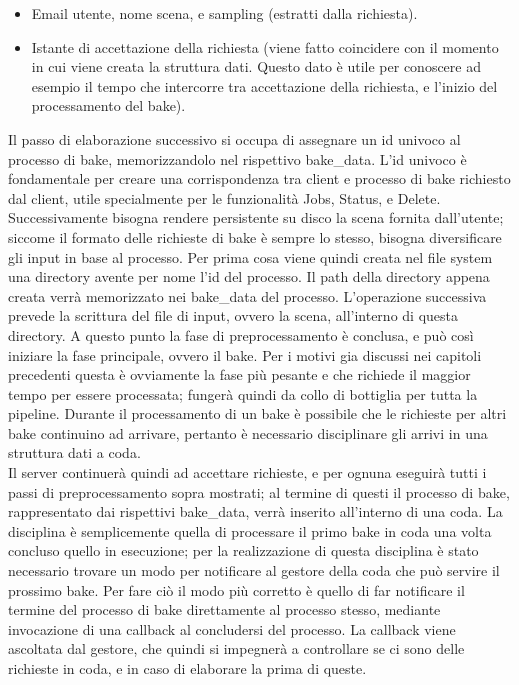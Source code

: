\begin{itemize}
\item Email utente, nome scena, e sampling (estratti dalla richiesta).
\item Istante di accettazione della richiesta (viene fatto coincidere con il momento in cui viene creata la struttura dati. Questo dato è utile per conoscere ad esempio il tempo che intercorre tra accettazione della richiesta, e l’inizio del processamento del bake).
\end{itemize}
Il passo di elaborazione successivo si occupa di assegnare un id univoco al processo di bake, memorizzandolo nel rispettivo bake\_data. L’id univoco è fondamentale per creare una corrispondenza tra client e processo di bake richiesto dal client, utile specialmente per le funzionalità Jobs, Status, e Delete. 
Successivamente bisogna rendere persistente su disco la scena fornita dall’utente; siccome il formato delle richieste di bake è sempre lo stesso, bisogna diversificare gli input in base al processo. Per prima cosa viene quindi creata nel file system una directory avente per nome l’id del processo. Il path della directory appena creata verrà memorizzato nei bake\_data del processo. 
L’operazione successiva prevede la scrittura del file di input, ovvero la scena, all’interno di questa directory. 
A questo punto la fase di preprocessamento è conclusa, e può così iniziare la fase principale, ovvero il bake. Per i motivi gia discussi nei capitoli precedenti questa è ovviamente la fase più pesante e che richiede il maggior tempo per essere processata; fungerà quindi da collo di bottiglia per tutta la pipeline. Durante il processamento di un bake è possibile che le richieste per altri bake continuino ad arrivare, pertanto è necessario disciplinare gli arrivi in una struttura dati a coda. 
\\
Il server continuerà quindi ad accettare richieste, e per ognuna eseguirà tutti i passi di preprocessamento sopra mostrati; al termine di questi il processo di bake, rappresentato dai rispettivi bake\_data, verrà inserito all’interno di una coda. La disciplina è semplicemente quella di processare il primo bake in coda una volta concluso quello in esecuzione; per la realizzazione di questa disciplina è stato necessario trovare un modo per notificare al gestore della coda che può servire il prossimo bake. Per fare ciò il modo più corretto è quello di far notificare il termine del processo di bake direttamente al processo stesso, mediante invocazione di una callback al concludersi del processo. La callback viene ascoltata dal gestore, che quindi si impegnerà a controllare se ci sono delle richieste in coda, e in caso di elaborare la prima di queste. 
